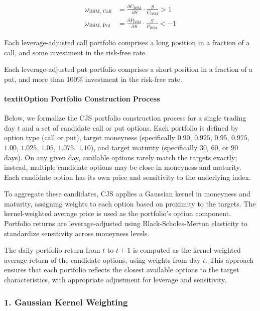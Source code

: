 \documentclass{article}
\begin{document}
\begin{appendices}
\begin{align}
\omega_{\text{BSM, Call}} &= \frac{\partial C_{\text{BSM}}}{\partial S} \cdot \frac{S}{C_{\text{BSM}}} > 1 \\
\omega_{\text{BSM, Put}}  &= \frac{\partial P_{\text{BSM}}}{\partial S} \cdot \frac{S}{P_{\text{BSM}}} < -1
\end{align}

Each leverage-adjusted call portfolio comprises a long position in a fraction of a call, and some investment in the risk-free rate.

Each leverage-adjusted put portfolio comprises a short position in a fraction of a put, and more than 100\% investment in the risk-free rate.

\paragraph{textit{Option Portfolio Construction Process}}


Below, we formalize the CJS portfolio construction process for a single trading day $t$ and a set of candidate call or put options. Each portfolio is defined by option type (call or put), target moneyness (specifically $0.90$, $0.925$, $0.95$, $0.975$, $1.00$, $1.025$, $1.05$, $1.075$, $1.10$), and target maturity (specifically $30$, $60$, or $90$ days). On any given day, available options rarely match the targets exactly; instead, multiple candidate options may be close in moneyness and maturity. Each candidate option has its own price and sensitivity to the underlying index. 

To aggregate these candidates, CJS applies a Gaussian kernel in moneyness and maturity, assigning weights to each option based on proximity to the targets. The kernel-weighted average price is used as the portfolio's option component. Portfolio returns are leverage-adjusted using Black-Scholes-Merton elasticity to standardize sensitivity across moneyness levels. 

The daily portfolio return from $t$ to $t+1$ is computed as the kernel-weighted average return of the candidate options, using weights from day $t$. This approach ensures that each portfolio reflects the closest available options to the target characteristics, with appropriate adjustment for leverage and sensitivity.

\subsubsection*{1. Gaussian Kernel Weighting}


\end{appendices}
\end{document}
